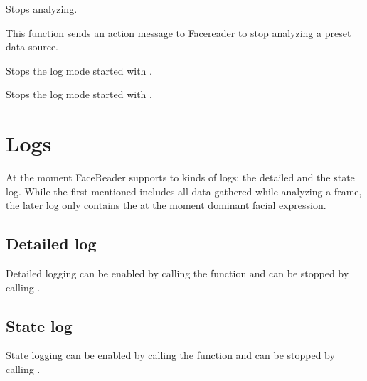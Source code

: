\documentclass[letterpaper,10pt,english]{sphinxmanual}
\begin{document}
\begin{fulllineitems}

\begin{fulllineitems}
\label{_static/facereader:FaceReader.FaceReader.stop_analyzing}
Stops analyzing.

This function sends an action message to Facereader to stop analyzing a preset data source.

\end{fulllineitems}


\begin{fulllineitems}
\label{_static/facereader:FaceReader.FaceReader.stop_detailed_log}
Stops the log mode started with {\hyperref[_static/facereader:FaceReader.FaceReader.start_detailed_log]{\emph{}}}.

\end{fulllineitems}


\begin{fulllineitems}
\label{_static/facereader:FaceReader.FaceReader.stop_state_log}
Stops the log mode started with {\hyperref[_static/facereader:FaceReader.FaceReader.start_state_log]{\emph{}}}.

\end{fulllineitems}


\end{fulllineitems}



\section{Logs}
\label{_static/facereader:logs}
At the moment FaceReader supports to kinds of logs: the detailed and
the state log. While the first mentioned includes all data gathered
while analyzing a frame, the later log only contains the at the moment
dominant facial expression.


\subsection{Detailed log}
\label{_static/facereader:detailed-log}
Detailed logging can be enabled by calling the function
 and can be stopped by calling
.


\subsection{State log}
\label{_static/facereader:state-log}
State logging can be enabled by calling the function
 and can be stopped by calling
.



\renewcommand{\indexname}{Index}
\printindex
\end{document}
